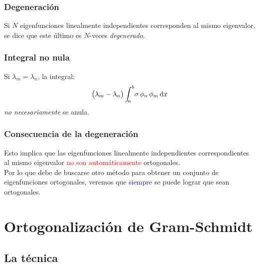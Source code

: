 \documentclass[12pt]{beamer}
\begin{document}
\begin{frame}
\frametitle{Degeneración}
Si $N$ eigenfunciones linealmente independientes corresponden al mismo eigenvalor, se dice que este último es $N$-veces \emph{degenerado}.
\end{frame}
\begin{frame}
\frametitle{Integral no nula}
Si $\lambda_{m} = \lambda_{n}$, la integral:
\pause
\begin{align*}
\big( \lambda_{m} - \lambda_{n} \big) \, \scaleint{5ex}_{\bs a}^{b} \sigma \, \phi_{n} \, \phi_{m} \dd{x}
\end{align*}
\emph{no necesariamente} se anula.
\end{frame}
\begin{frame}
\frametitle{Consecuencia de la degeneración}
Esto implica que las eigenfunciones linealmente independientes correspondientes al mismo eigenvalor \textcolor{red}{no son automáticamente} ortogonales.
\\
\bigskip
\pause
Por lo que debe de buscarse otro método para obtener un conjunto de eigenfunciones ortogonales, \pause veremos que \textcolor{blue}{siempre} se puede lograr que sean ortogonales.
\end{frame}

\section{Ortogonalización de Gram-Schmidt}
\subsection{La técnica}
\end{document}
